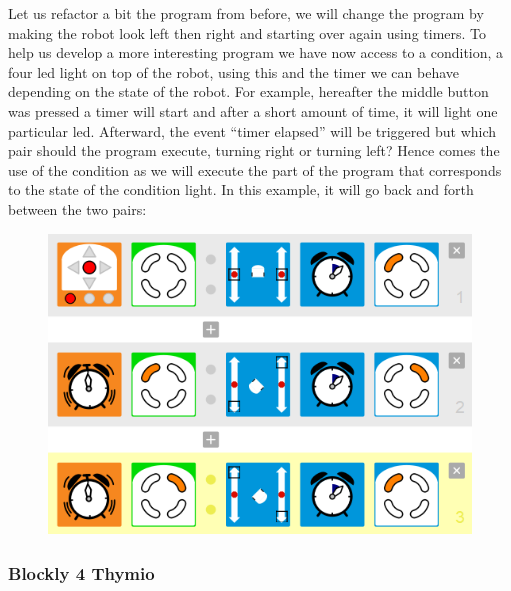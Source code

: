 \documentclass{scrartcl}
\begin{document}
Let us refactor a bit the program from before, we will change the program by making the robot look left then right and starting over again using timers. 
To help us develop a more interesting program we have now access to a condition, a four led light on top of the robot, using this and the timer we can behave depending on the state of the robot. 
For example, hereafter the middle button was pressed a timer will start and after a short amount of time, it will light one particular led. 
Afterward, the event “timer elapsed” will be triggered but which pair should the program execute, turning right or turning left? 
Hence comes the use of the condition as we will execute the part of the program that corresponds to the state of the condition light. 
In this example, it will go back and forth between the two pairs: 
\begin{figure}[h!]
  \includegraphics[width=\textwidth]{./VPL/middlebtn_3E_adv}
  \label{fig:thymio_vpl_middlebtn_3e9a}
\end{figure}

\subsubsection{Blockly 4 Thymio}
\end{document}
